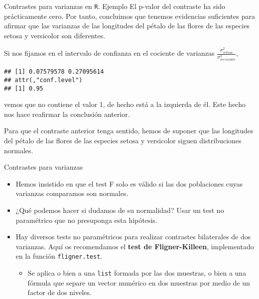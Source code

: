 \documentclass[
  ignorenonframetext,
]{beamer}
\newenvironment{Shaded}{\begin{snugshade}}{\end{snugshade}}
\newcommand{\KeywordTok}[1]{\textcolor[rgb]{0.13,0.29,0.53}{\textbf{#1}}}
\newcommand{\NormalTok}[1]{#1}
\newcommand{\OperatorTok}[1]{\textcolor[rgb]{0.81,0.36,0.00}{\textbf{#1}}}
\providecommand{\tightlist}{%
  \setlength{\itemsep}{0pt}\setlength{\parskip}{0pt}}
\begin{document}
\begin{frame}[fragile]{Contrastes para varianzas en \texttt{R}. Ejemplo}
\protect\hypertarget{contrastes-para-varianzas-en-r.-ejemplo-2}{}
El p-valor del contraste ha sido prácticamente cero. Por tanto,
concluimos que tenemos evidencias suficientes para afirmar que las
varianzas de las longitudes del pétalo de las flores de las especies
setosa y versicolor son diferentes.

Si nos fijamos en el intervalo de confianza en el cociente de varianzas
\(\frac{\sigma^2_{{ setosa}}}{\sigma^2_{{versicolor}}}\),

\begin{Shaded}
\end{Shaded}

\begin{verbatim}
## [1] 0.07579578 0.27095614
## attr(,"conf.level")
## [1] 0.95
\end{verbatim}

vemos que no contiene el valor 1, de hecho está a la izquierda de él.
Este hecho nos hace reafirmar la conclusión anterior.

Para que el contraste anterior tenga sentido, hemos de suponer que las
longitudes del pétalo de las flores de las especies setosa y versicolor
siguen distribuciones normales.
\end{frame}

\begin{frame}[fragile]{Contrastes para varianzas}
\protect\hypertarget{contrastes-para-varianzas}{}
\begin{itemize}
\item
  Hemos insistido en que el test F solo es válido si las dos poblaciones
  cuyas varianzas comparamos son normales.
\item
  ¿Qué podemos hacer si dudamos de su normalidad? Usar un test no
  paramétrico que no presuponga esta hipótesis.
\item
  Hay diversos tests no paramétricos para realizar contrastes
  bilaterales de dos varianzas. Aquí os recomendamos el \textbf{test de
  Fligner-Killeen}, implementado en la función \texttt{fligner.test}.

  \begin{itemize}
  \tightlist
  \item
    Se aplica o bien a una \texttt{list} formada por las dos muestras, o
    bien a una fórmula que separe un vector numérico en dos muestras por
    medio de un factor de dos niveles.
  \end{itemize}
\end{itemize}
\end{frame}
\end{document}
